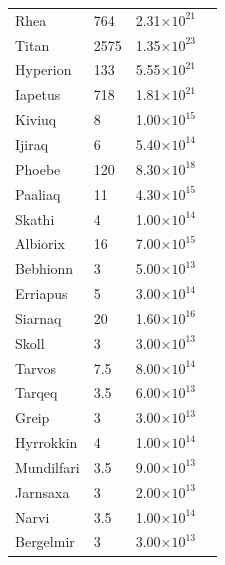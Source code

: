 \documentclass{aa}
\begin{document}
\begin{appendix}
\begin{table}[!ht]
\begin{tabular}{llll}
        Rhea & 764 & 2.31$\times10^{21 }$ & \cite{Williams_NSSDCA_SaturnianFact} \\ 
        Titan & 2575 & 1.35$\times10^{23 }$ & \cite{Williams_NSSDCA_SaturnianFact} \\ 
        Hyperion & 133 & 5.55$\times10^{21 }$ & \cite{Jacobson_2022} \\ 
        Iapetus & 718 & 1.81$\times10^{21 }$ & \cite{Williams_NSSDCA_SaturnianFact} \\ 
        Kiviuq & 8 & 1.00$\times10^{15 }$ & \cite{Denk_OuterMoonsSaturn} \\ 
        Ijiraq & 6 & 5.40$\times10^{14 }$ & \cite{Denk_OuterMoonsSaturn} \\ 
        Phoebe & 120 & 8.30$\times10^{18 }$ & \cite{Williams_NSSDCA_SaturnianFact} \\ 
        Paaliaq & 11 & 4.30$\times10^{15 }$ & \cite{Denk_OuterMoonsSaturn} \\ 
        Skathi & 4 & 1.00$\times10^{14 }$ & \cite{Denk_OuterMoonsSaturn} \\ 
        Albiorix & 16 & 7.00$\times10^{15 }$ & \cite{Denk_OuterMoonsSaturn} \\ 
        Bebhionn & 3 & 5.00$\times10^{13 }$ & \cite{Denk_OuterMoonsSaturn} \\ 
        Erriapus & 5 & 3.00$\times10^{14 }$ & \cite{Denk_OuterMoonsSaturn} \\ 
        Siarnaq & 20 & 1.60$\times10^{16 }$ & \cite{Denk_OuterMoonsSaturn} \\ 
        Skoll & 3 & 3.00$\times10^{13 }$ & \cite{Denk_OuterMoonsSaturn} \\ 
        Tarvos & 7.5 & 8.00$\times10^{14 }$ & \cite{Denk_OuterMoonsSaturn} \\ 
        Tarqeq & 3.5 & 6.00$\times10^{13 }$ & \cite{Denk_OuterMoonsSaturn} \\ 
        Greip & 3 & 3.00$\times10^{13 }$ & \cite{Denk_OuterMoonsSaturn} \\ 
        Hyrrokkin & 4 & 1.00$\times10^{14 }$ & \cite{Denk_OuterMoonsSaturn} \\ 
        Mundilfari & 3.5 & 9.00$\times10^{13 }$ & \cite{Denk_OuterMoonsSaturn} \\ 
        Jarnsaxa & 3 & 2.00$\times10^{13 }$ & \cite{Denk_OuterMoonsSaturn} \\ 
        Narvi & 3.5 & 1.00$\times10^{14 }$ & \cite{Denk_OuterMoonsSaturn} \\ 
        Bergelmir & 3 & 3.00$\times10^{13 }$ & \cite{Denk_OuterMoonsSaturn} \\ 

\end{tabular}
\end{table}
\end{appendix}
\end{document}
